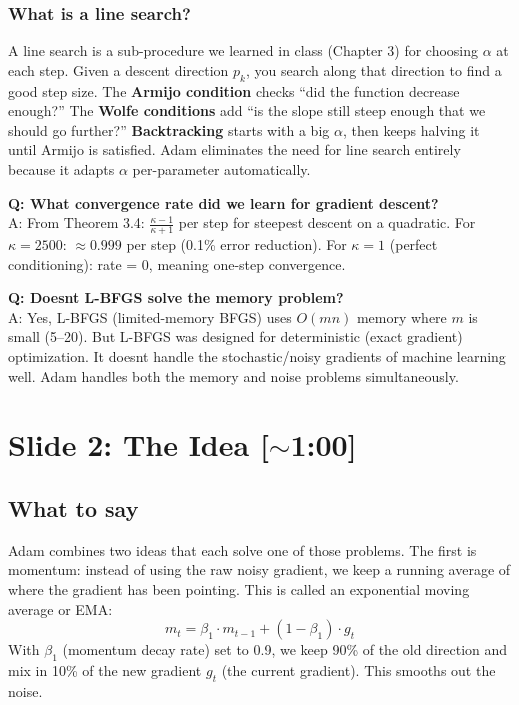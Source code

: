 \documentclass[11pt, letterpaper]{article}
\begin{document}
\begin{deepdive}
\subsubsection{What is a line search?}
A line search is a sub-procedure we learned in class (Chapter 3) for choosing $\alpha$ at each step. Given a descent direction $p_k$, you search along that direction to find a good step size. The \textbf{Armijo condition} checks ``did the function decrease enough?'' The \textbf{Wolfe conditions} add ``is the slope still steep enough that we should go further?'' \textbf{Backtracking} starts with a big $\alpha$, then keeps halving it until Armijo is satisfied. Adam eliminates the need for line search entirely because it adapts $\alpha$ per-parameter automatically.
\end{deepdive}

\begin{qabox}
\textbf{Q: What convergence rate did we learn for gradient descent?}\\
A: From Theorem 3.4: $\frac{\kappa - 1}{\kappa + 1}$ per step for steepest descent on a quadratic. For $\kappa = 2500$: $\approx 0.999$ per step (0.1\% error reduction). For $\kappa = 1$ (perfect conditioning): rate = 0, meaning one-step convergence.

\textbf{Q: Doesnt L-BFGS solve the memory problem?}\\
A: Yes, L-BFGS (limited-memory BFGS) uses $O(mn)$ memory where $m$ is small (5--20). But L-BFGS was designed for deterministic (exact gradient) optimization. It doesnt handle the stochastic/noisy gradients of machine learning well. Adam handles both the memory and noise problems simultaneously.
\end{qabox}


\section{Slide 2: The Idea \textnormal{\color{muted}[$\sim$1:00]}}

\subsection{What to say}

Adam combines two ideas that each solve one of those problems. The first is momentum: instead of using the raw noisy gradient, we keep a running average of where the gradient has been pointing. This is called an exponential moving average or EMA:
$$m_t = \beta_1 \cdot m_{t-1} + (1 - \beta_1) \cdot g_t$$
With $\beta_1$ (momentum decay rate) set to 0.9, we keep 90\% of the old direction and mix in 10\% of the new gradient $g_t$ (the current gradient). This smooths out the noise.
\end{document}
